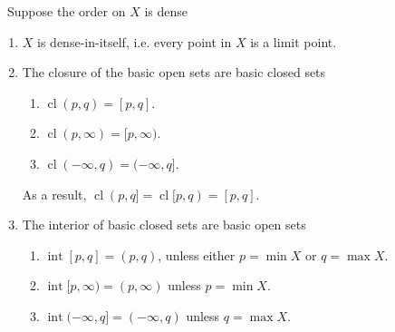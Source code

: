 \documentclass{treatise}
\begin{document}
\begin{proposition} \ 
Suppose the order on $X$ is dense
\begin{enumerate}
    \item $X$ is dense-in-itself, i.e. every point in $X$ is a limit point.
    \item The closure of the basic open sets are basic closed sets
    \begin{enumerate}
        \item $\operatorname{cl}(p, q) = [p, q]$.
        \item $\operatorname{cl}(p, \infty) = [p, \infty)$.
        \item $\operatorname{cl}(-\infty, q) = (-\infty, q]$.
    \end{enumerate}
    As a result, $\operatorname{cl}(p, q] = \operatorname{cl}[p, q) = [p, q]$.
    \item The interior of basic closed sets are basic open sets
    \begin{enumerate}
        \item $\operatorname{int}[p, q] = (p, q)$, unless either $p = \min X$ or $q = \max X$.
        \item $\operatorname{int}[p, \infty) = (p, \infty)$ unless $p = \min X$.
        \item $\operatorname{int}(-\infty, q] = (-\infty, q)$ unless $q = \max X$.
    \end{enumerate}
\end{enumerate}
\end{proposition}
\end{document}
